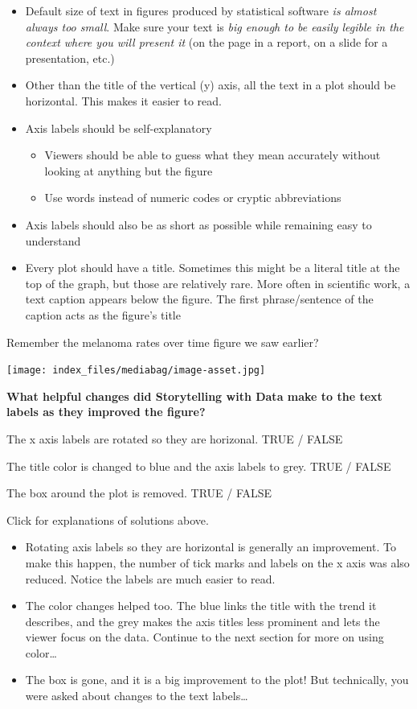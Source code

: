 \documentclass[
  letterpaper,
  DIV=11,
  numbers=noendperiod]{scrreprt}
\providecommand{\tightlist}{%
  \setlength{\itemsep}{0pt}\setlength{\parskip}{0pt}}\usepackage{longtable,booktabs,array}
\theoremstyle{remark}
\begin{document}
\begin{itemize}
\tightlist
\item
  Default size of text in figures produced by statistical software
  \emph{is almost always too small}. Make sure your text is \emph{big
  enough to be easily legible in the context where you will present it}
  (on the page in a report, on a slide for a presentation, etc.)
\item
  Other than the title of the vertical (y) axis, all the text in a plot
  should be horizontal. This makes it easier to read.
\item
  Axis labels should be self-explanatory

  \begin{itemize}
  \tightlist
  \item
    Viewers should be able to guess what they mean accurately without
    looking at anything but the figure
  \item
    Use words instead of numeric codes or cryptic abbreviations
  \end{itemize}
\item
  Axis labels should also be as short as possible while remaining easy
  to understand
\item
  Every plot should have a title. Sometimes this might be a literal
  title at the top of the graph, but those are relatively rare. More
  often in scientific work, a text caption appears below the figure. The
  first phrase/sentence of the caption acts as the figure's title
\end{itemize}

Remember the melanoma rates over time figure we saw earlier?

\texttt{[image: index\_files/mediabag/image-asset.jpg]}

\textbf{What helpful changes did Storytelling with Data make to the text
labels as they improved the figure?}

The x axis labels are rotated so they are horizonal. TRUE / FALSE

The title color is changed to blue and the axis labels to grey. TRUE /
FALSE

The box around the plot is removed. TRUE / FALSE

Click for explanations of solutions above.

\begin{itemize}
\tightlist
\item
  Rotating axis labels so they are horizontal is generally an
  improvement. To make this happen, the number of tick marks and labels
  on the x axis was also reduced. Notice the labels are much easier to
  read.
\item
  The color changes helped too. The blue links the title with the trend
  it describes, and the grey makes the axis titles less prominent and
  lets the viewer focus on the data. Continue to the next section for
  more on using color\ldots{}
\item
  The box is gone, and it is a big improvement to the plot! But
  technically, you were asked about changes to the text labels\ldots{}
\end{itemize}
\end{document}
